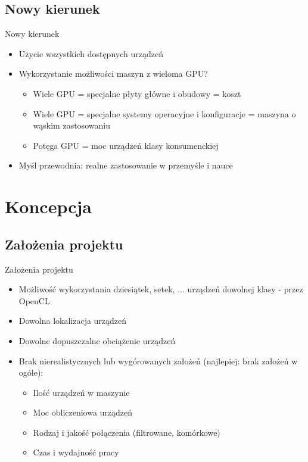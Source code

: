 \documentclass[12pt]{beamer}
\begin{document}
\subsection{Nowy kierunek}
\begin{frame}{Nowy kierunek}
\begin{itemize}
	\item Użycie wszystkich dostępnych urządzeń
	\item Wykorzystanie możliwości maszyn z wieloma GPU?
	\begin{itemize}
	    \item Wiele GPU = specjalne płyty główne i obudowy = koszt
	    \item Wiele GPU = specjalne systemy operacyjne i konfiguracje = maszyna o wąskim zastosowaniu
	    \item Potęga GPU = moc urządzeń klasy konsumenckiej
	\end{itemize}
	\item Myśl przewodnia: realne zastosowanie w przemyśle i nauce	
\end{itemize}
\end{frame}

\section{Koncepcja}
\subsection{Założenia projektu}
\begin{frame}{Założenia projektu}
\begin{itemize}
	\item Możliwość wykorzystania dziesiątek, setek, ... urządzeń dowolnej klasy - przez OpenCL
	\item Dowolna lokalizacja urządzeń
	\item Dowolne dopuszczalne obciążenie urządzeń
	\item Brak nierealistycznych lub wygórowanych założeń (najlepiej: brak założeń w ogóle):
	\begin{itemize}
		\item Ilość urządzeń w maszynie
		\item Moc obliczeniowa urządzeń
		\item Rodzaj i jakość połączenia (filtrowane, komórkowe)
		\item Czas i wydajność pracy	
	\end{itemize}
\end{itemize}
\end{frame}
\end{document}
